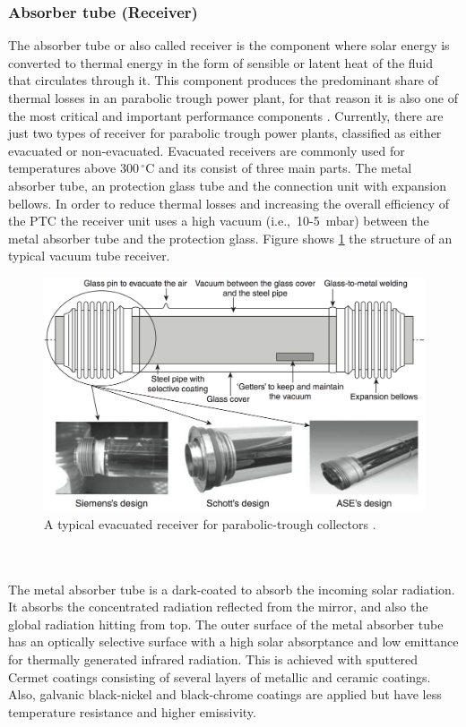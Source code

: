 \documentclass[Master,MEE,english]{twbook}%
\begin{document}
\subsubsection{Absorber tube (Receiver)}
The absorber tube or also called receiver is the component where solar energy is converted to thermal energy in the form of sensible or latent heat of the fluid that circulates through it. This component produces the predominant share of thermal losses in an parabolic trough power plant, for that reason it is also one of the most critical and important performance components \cite{Lupfert2013}. Currently, there are just two types of receiver for parabolic trough power plants, classified as either evacuated or non-evacuated. Evacuated receivers are commonly used for temperatures above 300$\,^{\circ}\mathrm{C}$ and its consist of three main parts. The metal absorber tube, an protection glass tube and the connection unit with expansion bellows. In order to reduce thermal losses and increasing the overall efficiency of the PTC the receiver unit uses a high vacuum (i.e.,~10-5~mbar) between the metal absorber tube and the protection glass. Figure shows \ref{absorber_tube} the structure of an typical vacuum tube receiver. 
\begin{figure}[!h] 
\centering
\includegraphics[width=0.9\linewidth]{FIG/absorber_tube}
\caption[A typical evacuated receiver for parabolic-trough collectors.]{A typical evacuated receiver for parabolic-trough collectors \cite{Moya2012}.}\label{absorber_tube}
\end{figure}
\\\\
The metal absorber tube is a dark-coated to absorb the incoming solar radiation. It absorbs the concentrated radiation reflected from the mirror, and also the global radiation hitting from top. The outer surface of the metal absorber tube has an optically selective surface with a high solar absorptance and low emittance for thermally generated infrared radiation. This is achieved with sputtered Cermet coatings consisting of several layers of metallic and ceramic coatings. Also, galvanic black-nickel and black-chrome coatings are applied but have less temperature resistance and higher emissivity. \cite{Platzer2012}\\
\end{document}
